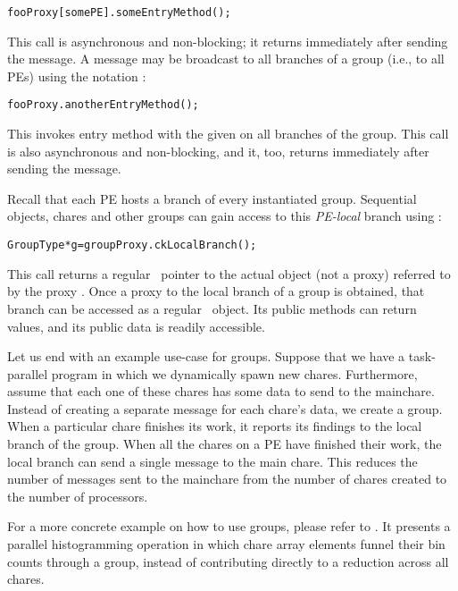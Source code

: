 \begin{alltt}
fooProxy[somePE].someEntryMethod();
\end{alltt}

This call is asynchronous and non-blocking; it returns immediately after sending the message.
A message may be broadcast  to all branches of a group
(i.e., to all PEs) using the notation :

\begin{alltt}
fooProxy.anotherEntryMethod();
\end{alltt}

This invokes entry method  with the given  on 
all branches of the group. This call is also asynchronous and non-blocking, and it, too, returns immediately
after sending the message.

Recall that each PE hosts a branch of every instantiated group. 
Sequential objects, chares and other groups can gain access to this {\em PE-local}
branch using :

\begin{alltt}
GroupType *g=groupProxy.ckLocalBranch();
\end{alltt}

This call returns a regular \CC\ pointer to the actual object (not a proxy)
referred to by the proxy .  Once a proxy to the
local branch of a group is obtained, that branch can be accessed as a regular
\CC\ object.  Its public methods can return values, and its public data is 
readily accessible.

Let us end with an example use-case for groups.
Suppose that we have a task-parallel program in which we dynamically spawn
new chares. Furthermore, assume that each one of these chares has some data
to send to the mainchare.  Instead of creating a separate message for each 
chare's data, we create a group. When a particular chare
finishes its work, it reports its findings to the local branch of the group.
When all the chares on a PE have finished their work, the local branch
can send a single message to the main chare.  This reduces the number of messages
sent to the mainchare from the number of chares created to the number of processors. 

For a more concrete example on how to use groups, please refer to
. It presents a parallel
histogramming operation in which chare array elements funnel their bin counts
through a group, instead of contributing directly to a reduction across all
chares.

